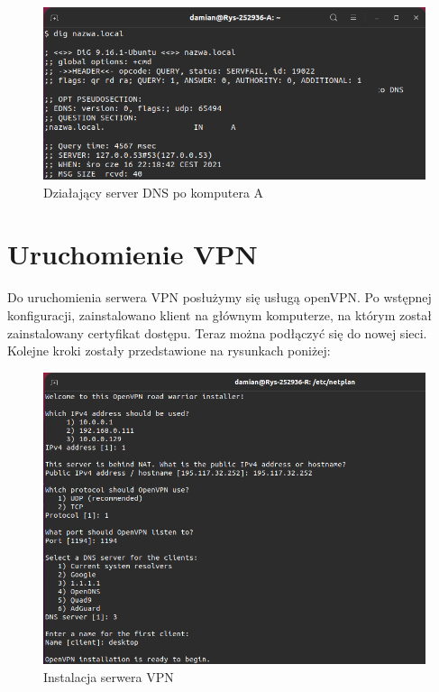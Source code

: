 \documentclass{article}
\begin{document}
\begin{figure}[H]
    \centering
    \includegraphics[scale = 0.45]{DNS/dns.png}  
    \caption{Działający server DNS po komputera A}
    \label{2}
\end{figure}
\newpage
\section{Uruchomienie VPN}
Do uruchomienia serwera VPN posłużymy się usługą openVPN. Po wstępnej konfiguracji, zainstalowano klient na głównym komputerze, na którym został zainstalowany certyfikat dostępu. Teraz można podłączyć się do nowej sieci. Kolejne kroki zostały przedstawione na rysunkach poniżej:

\begin{figure}[H]
    \centering
    \includegraphics[scale = 0.45]{VPN/RgpW9tg.png}  
    \caption{Instalacja serwera VPN }
    \label{2}
\end{figure}
\end{document}
